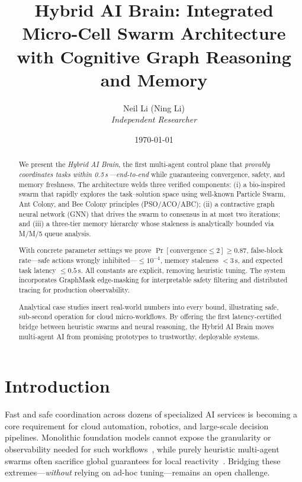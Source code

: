 \documentclass{article}
\title{Hybrid AI Brain: Integrated Micro-Cell Swarm Architecture with Cognitive Graph Reasoning and Memory}
\author{
Neil Li (Ning Li)\\
\textit{Independent Researcher}\\
\texttt{}
}
\date{\today}
\begin{document}
\maketitle

    \begin{abstract}
    We present the \emph{Hybrid AI Brain}, the first multi-agent control plane that \emph{provably coordinates tasks within 0.5\,s\,---end-to-end} while guaranteeing convergence, safety, and memory freshness. The architecture welds three verified components: (i) a bio-inspired swarm that rapidly explores the task--solution space using well-known Particle Swarm, Ant Colony, and Bee Colony principles (PSO/ACO/ABC); (ii) a contractive graph neural network (GNN) that drives the swarm to consensus in at most two iterations; and (iii) a three-tier memory hierarchy whose staleness is analytically bounded via M/M/5 queue analysis.
    
    With concrete parameter settings we prove $\Pr[\text{convergence} \leq 2] \geq 0.87$, false-block rate---safe actions wrongly inhibited---$\leq 10^{-4}$, memory staleness $< 3\,\text{s}$, and expected task latency $\leq 0.5\,\text{s}$. All constants are explicit, removing heuristic tuning. The system incorporates GraphMask edge-masking for interpretable safety filtering and distributed tracing for production observability.
    
    Analytical case studies insert real-world numbers into every bound, illustrating safe, sub-second operation for cloud micro-workflows. By offering the first latency-certified bridge between heuristic swarms and neural reasoning, the Hybrid AI Brain moves multi-agent AI from promising prototypes to trustworthy, deployable systems.
    \end{abstract}
    
    \section{Introduction}\label{sec:introduction}
    
    Fast and safe coordination across dozens of specialized AI services is becoming a core requirement for cloud automation, robotics, and large-scale decision pipelines. Monolithic foundation models cannot expose the granularity or observability needed for such workflows~\cite{wei2022chain}, while purely heuristic multi-agent swarms often sacrifice global guarantees for local reactivity~\cite{park2023generative}. Bridging these extremes---\emph{without} relying on ad-hoc tuning---remains an open challenge.
    
\end{document}
